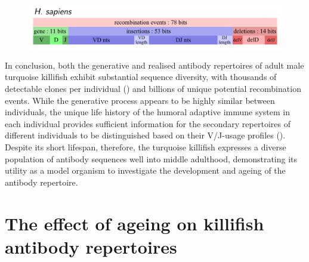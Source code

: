 \begin{figure}
\centering
\includegraphics[width = \textwidth]{_Figures/png_edited/human-repertoire-entropy.png}
\label{fig:igseq-pilot-human-entropies}
\end{figure}

In conclusion, both the generative and realised antibody repertoires of adult male turquoise killifish exhibit substantial sequence diversity, with thousands of detectable clones per individual () and billions of unique potential recombination events. While the generative process appears to be highly similar between individuals, the unique life history of the humoral adaptive immune system in each individual provides sufficient information for the secondary repertoires of different individuals to be distinguished based on their V/J-usage profiles (). Despite its short lifespan, therefore, the turquoise killifish expresses a diverse population of antibody sequences well into middle adulthood, demonstrating its utility as a model organism to investigate the development and ageing of the antibody repertoire.

\FloatBarrier
\clearpage

\section{The effect of ageing on killifish antibody repertoires}
\label{sec:igseq_ageing}

